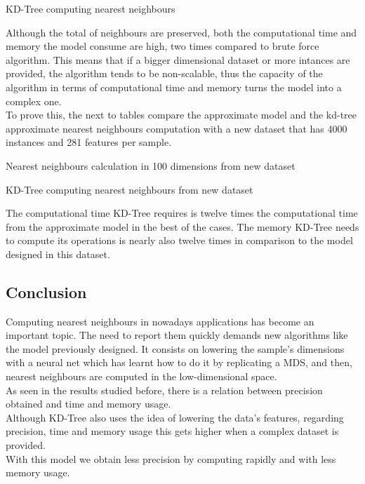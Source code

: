 \documentclass[a4paper,11pt,spanish]{report}
\begin{document}
\begin{table}[h]
\centering

\caption{\label{metrics24}KD-Tree computing nearest neighbours}
\end{table}

Although the total of neighbours are preserved, both the computational time and memory the model consume are high, two times compared to brute force algorithm. This means that if a bigger dimensional dataset or more intances are provided, the algorithm tends to be non-scalable, thus the capacity of the algorithm in terms of computational time and memory turns the model into a complex one.\\
To prove this, the next to tables compare the approximate model and the kd-tree approximate nearest neighbours computation with a new dataset that has 4000 instances and 281 features per sample.

\begin{table}[h]
\centering

\caption{\label{metrics25}Nearest neighbours calculation in 100 dimensions from new dataset}
\end{table}

\begin{table}[h]
\centering

\caption{\label{metrics26}KD-Tree computing nearest neighbours from new dataset}
\end{table}

The computational time KD-Tree requires is twelve times the computational time from the approximate model in the best of the cases. The memory KD-Tree needs to compute its operations is nearly also twelve times in comparison to the model designed in this dataset.

\subsection{Conclusion}
\label{ssec:conc2}

Computing nearest neighbours in nowadays applications has become an important topic. The need to report them quickly demands new algorithms like the model previously designed. It consists on lowering the sample's dimensions with a neural net which has learnt how to do it by replicating a MDS, and then, nearest neighbours are computed in the low-dimensional space.\\
As seen in the results studied before, there is a relation between precision obtained and time and memory usage.\\
Although KD-Tree also uses the idea of lowering the data's features, regarding precision, time and memory usage this gets higher when a complex dataset is provided.\\
With this model we obtain less precision by computing rapidly and with less memory usage.
\end{document}
